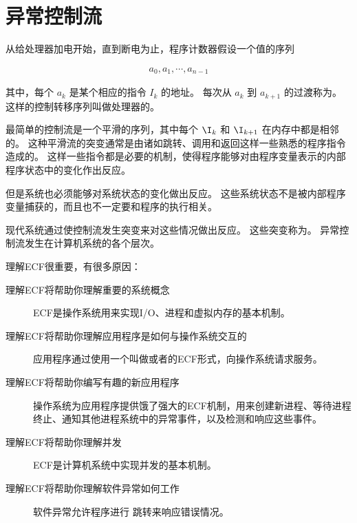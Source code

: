 
\chapter{异常控制流}
{
    从给处理器加电开始，直到断电为止，程序计数器假设一个值的序列

    \begin{align*}
        a_0, a_1, \cdots, a_{n -1}
    \end{align*}

    其中，每个 $a_k$ 是某个相应的指令 $I_k$ 的地址。
    每次从 $a_k$ 到 $a_{k + 1}$ 的过渡称为。
    这样的控制转移序列叫做处理器的。

    最简单的控制流是一个平滑的序列，其中每个 $\I_k$ 和 $\I_{k + 1}$ 在内存中都是相邻的。
    这种平滑流的突变通常是由诸如跳转、调用和返回这样一些熟悉的程序指令造成的。
    这样一些指令都是必要的机制，使得程序能够对由程序变量表示的内部程序状态中的变化作出反应。

    但是系统也必须能够对系统状态的变化做出反应。
    这些系统状态不是被内部程序变量捕获的，而且也不一定要和程序的执行相关。

    现代系统通过使控制流发生突变来对这些情况做出反应。
    这些突变称为。
    异常控制流发生在计算机系统的各个层次。

    理解ECF很重要，有很多原因：

    \begin{description}
        \item[理解ECF将帮助你理解重要的系统概念] ECF是操作系统用来实现I/O、进程和虚拟内存的基本机制。
        \item[理解ECF将帮助你理解应用程序是如何与操作系统交互的] 应用程序通过使用一个叫做或者的ECF形式，向操作系统请求服务。
        \item[理解ECF将帮助你编写有趣的新应用程序] 操作系统为应用程序提供饿了强大的ECF机制，用来创建新进程、等待进程终止、通知其他进程系统中的异常事件，以及检测和响应这些事件。
        \item[理解ECF将帮助你理解并发] ECF是计算机系统中实现并发的基本机制。
        \item[理解ECF将帮助你理解软件异常如何工作] 软件异常允许程序进行 跳转来响应错误情况。
    \end{description}

    
}

\cleardoublepage

\endinput
